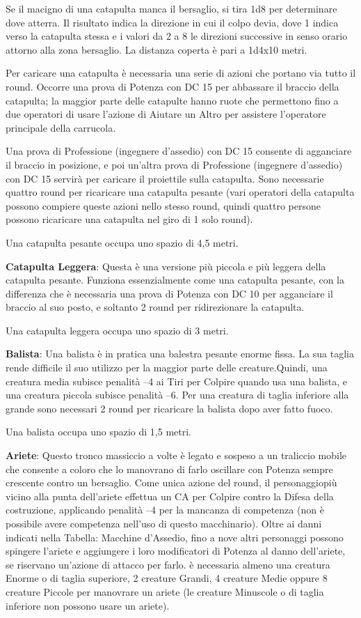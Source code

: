 \documentclass[a4paper,11pt,twoside,openany]{book}
\begin{document}
{Se il macigno di una catapulta manca il bersaglio, si tira 1d8 per determinare dove atterra. Il risultato indica la direzione in cui il colpo devia, dove 1 indica verso la catapulta stessa e i valori da 2 a 8 le direzioni successive in senso orario attorno alla zona bersaglio. La distanza coperta è pari a 1d4x10 metri.

Per caricare una catapulta è necessaria una serie di azioni che portano via tutto il round. Occorre una prova di Potenza con DC 15 per abbassare il braccio della catapulta; la maggior parte delle catapulte hanno ruote che permettono fino a due operatori di usare l'azione di Aiutare un Altro per assistere l'operatore principale della carrucola.

Una prova di Professione (ingegnere d'assedio) con DC 15 consente di agganciare il braccio in posizione, e poi un'altra prova di Professione (ingegnere d'assedio) con DC 15 servirà per caricare il proiettile sulla catapulta. Sono necessarie quattro round per ricaricare una catapulta pesante (vari operatori della catapulta possono compiere queste azioni nello stesso round, quindi quattro persone possono ricaricare una catapulta nel giro di 1 solo round).

Una catapulta pesante occupa uno spazio di 4,5 metri.

\textbf{Catapulta Leggera}: Questa è una versione più piccola e più leggera della catapulta pesante. Funziona essenzialmente come una catapulta pesante, con la differenza che è necessaria una prova di Potenza con DC 10 per agganciare il braccio al suo posto, e soltanto 2 round per ridirezionare la catapulta.

Una catapulta leggera occupa uno spazio di 3 metri.

\textbf{Balista}: Una balista è in pratica una balestra pesante enorme fissa. La sua taglia rende difficile il suo utilizzo per la maggior parte delle creature.Quindi, una creatura media subisce penalità --4 ai Tiri per Colpire quando usa una balista, e una creatura piccola subisce penalità --6. Per una creatura di taglia inferiore alla grande sono necessari 2 round per ricaricare la balista dopo aver fatto fuoco.

Una balista occupa uno spazio di 1,5 metri.

\textbf{Ariete}: Questo tronco massiccio a volte è legato e sospeso a un traliccio mobile che consente a coloro che lo manovrano di farlo oscillare con Potenza sempre crescente contro un bersaglio. Come unica azione del round, il personaggiopiù vicino alla punta dell'ariete effettua un CA per Colpire contro la Difesa della costruzione, applicando penalità --4 per la mancanza di competenza (non è possibile avere competenza nell'uso di questo macchinario). Oltre ai danni indicati nella Tabella: Macchine d'Assedio, fino a nove altri personaggi possono spingere l'ariete e aggiungere i loro modificatori di Potenza al danno dell'ariete, se riservano un'azione di attacco per farlo. è necessaria almeno una creatura Enorme o di taglia superiore, 2 creature Grandi, 4 creature Medie oppure 8 creature Piccole per manovrare un ariete (le creature Minuscole o di taglia inferiore non possono usare un ariete).

}
\end{document}
